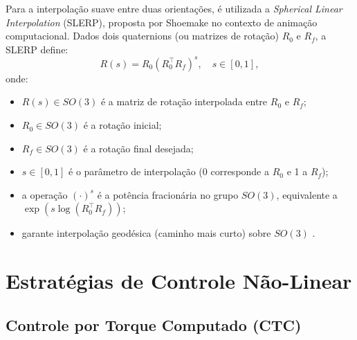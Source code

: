 Para a interpolação suave entre duas orientações, é utilizada a \textit{Spherical Linear Interpolation} (SLERP), proposta por Shoemake \cite{shoemake1985animating} no contexto de animação computacional. Dados dois quaternions (ou matrizes de rotação) $R_0$ e $R_f$, a SLERP define:
\begin{equation}
    R(s) = R_0 \left(R_0^\top R_f\right)^s, \quad s \in [0,1],
    \label{eq:slerp}
\end{equation}
onde:
\begin{itemize}
    \item $R(s) \in SO(3)$ é a matriz de rotação interpolada entre $R_0$ e $R_f$;
    \item $R_0 \in SO(3)$ é a rotação inicial;
    \item $R_f \in SO(3)$ é a rotação final desejada;
    \item $s \in [0, 1]$ é o parâmetro de interpolação (0 corresponde a $R_0$ e 1 a $R_f$);
    \item a operação $(\cdot)^s$ é a potência fracionária no grupo $SO(3)$, equivalente a $\exp(s \log(R_0^\top R_f))$;
    \item garante interpolação geodésica (caminho mais curto) sobre $SO(3)$ \cite{dam1998quaternions}.
\end{itemize}

\section{Estratégias de Controle Não-Linear}
\label{sec:controle}

\subsection{Controle por Torque Computado (CTC)}

